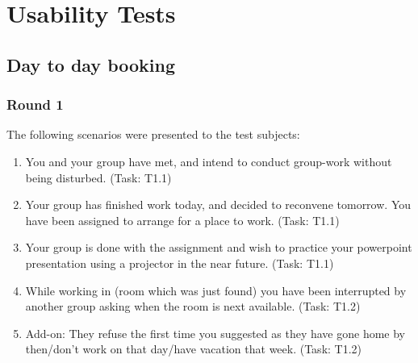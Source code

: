 \section{Usability Tests}
\label{app:tests}
\subsection{Day to day booking}
\subsubsection{Round 1}
The following scenarios were presented to the test subjects:
\begin{enumerate}
\item You and your group have met, and intend to conduct group-work without being disturbed. (Task: T1.1)
\item Your group has finished work today, and decided to reconvene tomorrow. You have been assigned to arrange for a place to work. (Task: T1.1)
\item Your group is done with the assignment and wish to practice your powerpoint presentation using a projector in the near future. (Task: T1.1)
\item While working in (room which was just found) you have been interrupted by another group asking when the room is next available. (Task: T1.2)
\item Add-on: They refuse the first time you suggested as they have gone home by then/don't work on that day/have vacation that week. (Task: T1.2)
\end{enumerate}

